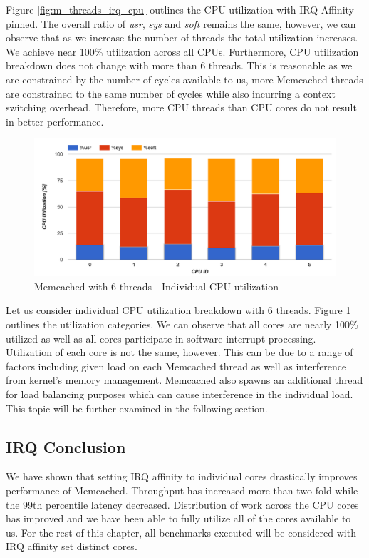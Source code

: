Figure \ref{fig:m_threads_irq_cpu} outlines the CPU utilization with IRQ Affinity pinned. The overall ratio of \textit{usr}, \textit{sys} and \textit{soft} remains the same, however, we can observe that as we increase the number of threads the total utilization increases. We achieve near 100\% utilization across all CPUs. Furthermore, CPU utilization breakdown does not change with more than 6 threads. This is reasonable as we are constrained by the number of cycles available to us, more Memcached threads are constrained to the same number of cycles while also incurring a context switching overhead. Therefore, more CPU threads than CPU cores do not result in better performance.

\begin{figure}[h]
    \includegraphics[width=\textwidth]{./res2/m_threads_irq_cpu_individual.png}
    \caption{Memcached with 6 threads - Individual CPU utilization}
    \label{fig:m_threads_irq_cpu_individual}
\end{figure}

Let us consider individual CPU utilization breakdown with 6 threads. Figure \ref{fig:m_threads_irq_cpu_individual} outlines the utilization categories. We can observe that all cores are nearly 100\% utilized as well as all cores participate in software interrupt processing. Utilization of each core is not the same, however. This can be due to a range of factors including given load on each Memcached thread as well as interference from kernel's memory management. Memcached also spawns an additional thread for load balancing purposes \cite{solarflarememcached} which can cause interference in the individual load. This topic will be further examined in the following section.


\subsection{IRQ Conclusion}
We have shown that setting IRQ affinity to individual cores drastically improves performance of Memcached. Throughput has increased more than two fold while the 99th percentile latency decreased. Distribution of work across the CPU cores has improved and we have been able to fully utilize all of the cores available to us. For the rest of this chapter, all benchmarks executed will be considered with IRQ affinity set distinct cores.

